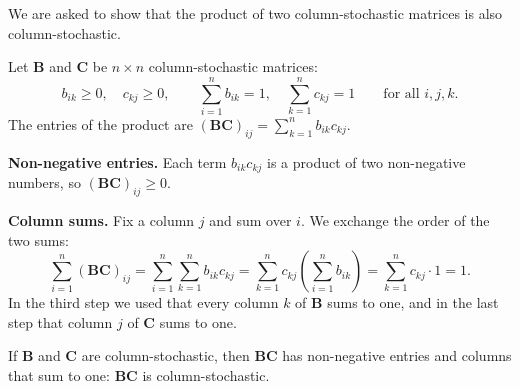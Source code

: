 

We are asked to show that the product of two column-stochastic matrices is also column-stochastic.


Let $\mathbf{B}$ and $\mathbf{C}$ be $n \times n$ column-stochastic matrices:
\[
  b_{ik} \ge 0,\quad c_{kj} \ge 0, \qquad \sum_{i=1}^n b_{ik} = 1,\quad \sum_{k=1}^n c_{kj} = 1 \qquad \text{for all } i,j,k .
\]
The entries of the product are $(\mathbf{BC})_{ij} = \sum_{k=1}^n b_{ik}c_{kj}$.


\textbf{Non-negative entries.} Each term $b_{ik}c_{kj}$ is a product of two non-negative numbers, so $(\mathbf{BC})_{ij} \ge 0$.

\textbf{Column sums.} Fix a column $j$ and sum over $i$. We exchange the order of the two sums:
\[
  \sum_{i=1}^n (\mathbf{BC})_{ij}
  = \sum_{i=1}^n \sum_{k=1}^n b_{ik}c_{kj}
  = \sum_{k=1}^n c_{kj} \left( \sum_{i=1}^n b_{ik} \right)
  = \sum_{k=1}^n c_{kj} \cdot 1
  = 1 .
\]
In the third step we used that every column $k$ of $\mathbf{B}$ sums to one, and in the last step that column $j$ of $\mathbf{C}$ sums to one.


If $\mathbf{B}$ and $\mathbf{C}$ are column-stochastic, then $\mathbf{BC}$ has non-negative entries and columns that sum to one: $\mathbf{BC}$ is column-stochastic.
